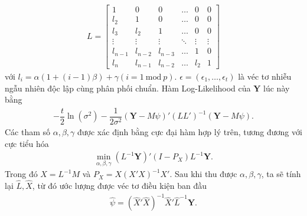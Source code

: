     \begin{align}
        L = \begin{bmatrix}
        1 & 0 & 0 & \dots & 0  & 0\\
        l_2 & 1 & 0 & \dots & 0  & 0\\
        l_3 & l_2 & 1 & \dots & 0  &0\\
        \vdots& \vdots& \vdots& \ddots&\vdots &\vdots\\
        l_{n-1} & l_{n-2} & l_{n-3} & \dots& 1 & 0\\
        l_n& l_{n-1}& l_{n-2}&\dots&l_2&1
        \end{bmatrix}
    \end{align}
    với $l_i = \alpha\left(1 + \left(i-1\right)\beta\right) + \gamma\left(i = 1 \ \text{mod} \ p \right)$. $\epsilon = \left(\epsilon_1, \dots, \epsilon_t\right)$ là véc tơ nhiễu ngẫu nhiên độc lập cùng phân phối chuẩn.
    Hàm Log-Likelihood của $\textbf{Y}$ lúc này bằng
    \begin{align}
        -\dfrac{t}{2}\ln\left(\sigma^2\right) - \dfrac{1}{2\sigma^2} \left(\textbf{Y} - M \psi\right)'\left(LL'\right)^{-1}\left(\textbf{Y} - M \psi\right).
    \end{align}
    Các tham số $\alpha, \beta, \gamma$ được xác định bằng cực đại hàm hợp lý trên, tương đương với cực tiểu hóa
    \begin{align}
        \min_{\alpha, \beta, \gamma} \left(L^{-1} \textbf{Y}\right)' \left(I - P_X\right) L^{-1} \textbf{Y}.
    \end{align}
    Trong đó $X = L^{-1}M$ và $P_X = X \left(X'X\right)^{-1}X'$. Sau khi thu được $\alpha, \beta, \gamma$, ta sẽ tính lại $\hat{L}, \hat{X}$, từ đó ước lượng được véc tơ điều kiện ban đầu
    \begin{align}
        \hat{\psi} = \left(\hat{X}'\hat{X}\right)^{-1} \hat{X}'\hat{L}^{-1} \textbf{Y}.
    \end{align}
    

